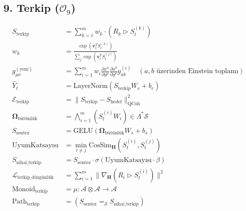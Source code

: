 \documentclass[11pt, a4paper]{article}
\begin{document}
\subsection{9. Terkip ($\mathcal{O}_9$)}
\begin{align}
S_{\text{terkip}} &= \sum_{k=1}^m w_k \cdot \left( R_k \triangleright S_t^{(k)} \right) \\
w_k &= \frac{\exp(\mathbf{v}_t^T S_t^{(k)})}{\sum_j \exp(\mathbf{v}_t^T S_t^{(j)})} \\
g_{\mu\nu}^{(\text{yeni})} &= \sum_{i=1}^m w_i \frac{\partial x^a}{\partial y^\mu} \frac{\partial x^b}{\partial y^\nu} g_{ab}^{(i)} \quad (a, b \text{ üzerinden Einstein toplamı}) \\
\hat{Y}_t &= \text{LayerNorm}(S_{\text{terkip}} W_c + b_c) \\
\mathcal{E}_{\text{terkip}} &= \| S_{\text{terkip}} - S_{\text{hedef}} \|_{\text{QCoh}}^2 \\
\mathbf{\Omega}_{\text{bütünlük}} &= \bigwedge_{i=1}^m (S_t^{(i)} W_i) \in \Lambda^* \mathcal{S} \\
S_{\text{sentez}} &= \text{GELU}\left( \mathbf{\Omega}_{\text{bütünlük}} W_s + b_s \right) \\
\text{UyumKatsayısı} &= \min_{i \neq j} \text{CosSim}_{\mathbf{H}}(S_t^{(i)}, S_t^{(j)}) \\
S_{\text{nihai\_terkip}} &= S_{\text{sentez}} \cdot \sigma(\text{UyumKatsayısı} \cdot \beta) \\
\mathcal{L}_{\text{terkip\_düzgünlük}} &= \sum_{i=1}^m \| \nabla_{\mathbf{H}} (R_i \triangleright S_t^{(i)}) \|^2 \\
\text{Monoid}_{\text{terkip}} &= \mu : \mathcal{A} \otimes \mathcal{A} \to \mathcal{A} \\
\text{Path}_{\text{terkip}} &= (S_{\text{sentez}} =_{\mathcal{S}} S_{\text{nihai\_terkip}})
\end{align}
\end{document}
